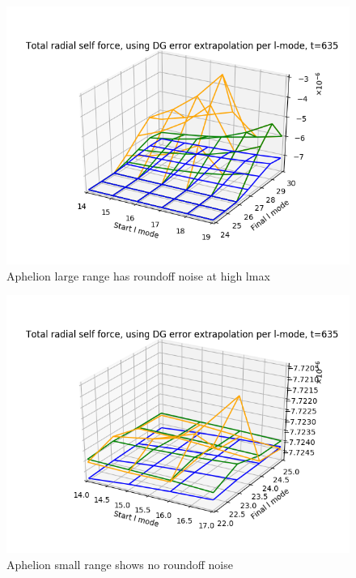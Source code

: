 \documentclass{article}
\begin{document}
\begin{figure}
  \includegraphics{bestfinflminlmax234terms635fullrange_perihelion}
\caption{Aphelion large range has roundoff noise at high lmax}
\end{figure}

\begin{figure}
  \includegraphics{bestfinflminlmax234termst635smallrange_perihelion}
\caption{Aphelion small range shows no roundoff noise}
\end{figure}
\end{document}
